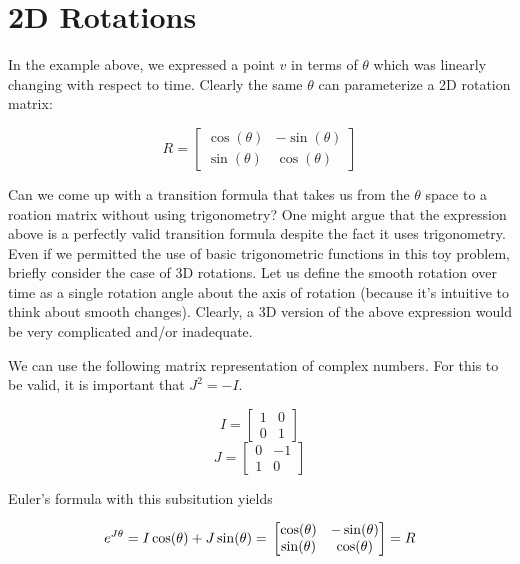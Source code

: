 \documentclass{article}
\begin{document}
\section{2D Rotations}
  In the example above, we expressed a point $v$ in terms of $\theta$ which was linearly changing with respect to time. Clearly the same $\theta$ can parameterize a 2D rotation matrix:

  \begin{equation}
    R = \left[\begin{matrix} \cos(\theta) & -\sin(\theta) \\
                             \sin(\theta) & \cos(\theta) \end{matrix}\right]
  \end{equation}

  Can we come up with a transition formula that takes us from the $\theta$ space to a roation matrix without using trigonometry? One might argue that the expression above is a perfectly valid transition formula despite the fact it uses trigonometry. Even if we permitted the use of basic trigonometric functions in this toy problem, briefly consider the case of 3D rotations. Let us define the smooth rotation over time as a single rotation angle about the axis of rotation (because it's intuitive to think about smooth changes). Clearly, a 3D version of the above expression would be very complicated and/or inadequate.

  We can use the following matrix representation of complex numbers. For this to be valid, it is important that $J^2 = -I$.

  \begin{equation}
    I = \left[\begin{matrix} 1 & 0 \\
                             0 & 1 \end{matrix}\right]
  \end{equation}
  \begin{equation}
    J = \left[\begin{matrix} 0 & -1 \\
                             1 & 0  \end{matrix}\right]
  \end{equation}

  Euler's formula with this subsitution yields

  \begin{equation}
    e^{J\theta} = I\cos(\theta) + J\sin(\theta) = \\
    \left[\begin{matrix} \cos(\theta) & -\sin(\theta) \\
                         \sin(\theta) & \cos(\theta) \end{matrix}\right] = \\
    R
  \end{equation}
\end{document}
